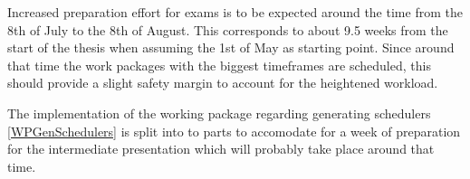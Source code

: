 \documentclass[paper=a4,nochapname,accentcolor=tud9c]{tudexercise}
\begin{document}
\medskip

Increased preparation effort for exams is to be expected around the time from
the 8th of July to the 8th of August. This corresponds to about 9.5 weeks from the
start of the thesis when assuming the 1st of May as starting point.
Since around that time the work packages with the biggest timeframes are
scheduled, this should provide a slight safety margin to account for the
heightened workload.

The implementation of the working package regarding generating schedulers
\ref{WPGenSchedulers} is split into to parts to accomodate for a week of
preparation for the intermediate presentation which will probably take place
around that time.

\printbibliography[heading=subbibintoc]
\end{document}

